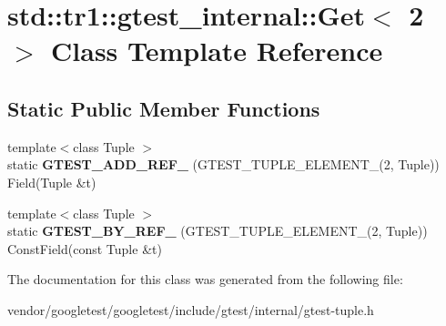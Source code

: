 \hypertarget{classstd_1_1tr1_1_1gtest__internal_1_1Get_3_012_01_4}{}\section{std\+:\+:tr1\+:\+:gtest\+\_\+internal\+:\+:Get$<$ 2 $>$ Class Template Reference}
\label{classstd_1_1tr1_1_1gtest__internal_1_1Get_3_012_01_4}
\subsection*{Static Public Member Functions}
\begin{DoxyCompactItemize}
\item 
{\footnotesize template$<$class Tuple $>$ }\\static {\bfseries G\+T\+E\+S\+T\+\_\+\+A\+D\+D\+\_\+\+R\+E\+F\+\_\+} (G\+T\+E\+S\+T\+\_\+\+T\+U\+P\+L\+E\+\_\+\+E\+L\+E\+M\+E\+N\+T\+\_\+(2, Tuple)) Field(Tuple \&t)\hypertarget{classstd_1_1tr1_1_1gtest__internal_1_1Get_3_012_01_4_a8dfe7b5c1c915f10181e3fb5952ba6d8}{}\label{classstd_1_1tr1_1_1gtest__internal_1_1Get_3_012_01_4_a8dfe7b5c1c915f10181e3fb5952ba6d8}

\item 
{\footnotesize template$<$class Tuple $>$ }\\static {\bfseries G\+T\+E\+S\+T\+\_\+\+B\+Y\+\_\+\+R\+E\+F\+\_\+} (G\+T\+E\+S\+T\+\_\+\+T\+U\+P\+L\+E\+\_\+\+E\+L\+E\+M\+E\+N\+T\+\_\+(2, Tuple)) Const\+Field(const Tuple \&t)\hypertarget{classstd_1_1tr1_1_1gtest__internal_1_1Get_3_012_01_4_a76127c9c03c1f0caa61fb87d4d756b5b}{}\label{classstd_1_1tr1_1_1gtest__internal_1_1Get_3_012_01_4_a76127c9c03c1f0caa61fb87d4d756b5b}

\end{DoxyCompactItemize}


The documentation for this class was generated from the following file\+:\begin{DoxyCompactItemize}
\item 
vendor/googletest/googletest/include/gtest/internal/gtest-\/tuple.\+h\end{DoxyCompactItemize}
